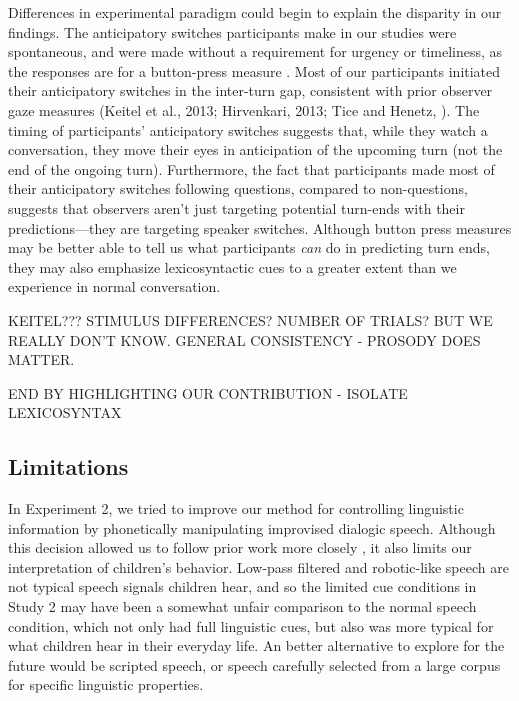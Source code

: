 \documentclass[authoryear, 12pt]{elsarticle}
\begin{document}
Differences in experimental paradigm could begin to explain the disparity in our findings. The anticipatory switches participants make in our studies were spontaneous, and were made without a requirement for urgency or timeliness, as the responses are for a button-press measure \citep{de-ruiter2006, magyari2012}. Most of our participants initiated their anticipatory switches in the inter-turn gap, consistent with prior observer gaze measures (Keitel et al., 2013; Hirvenkari, 2013; Tice and Henetz, \citeyear{TiceHenetz11}). The timing of participants' anticipatory switches suggests that, while they watch a conversation, they move their eyes in anticipation of the upcoming turn (not the end of the ongoing turn). Furthermore, the fact that participants made most of their anticipatory switches following questions, compared to non-questions, suggests that observers aren't just targeting potential turn-ends with their predictions---they are targeting speaker switches. Although button press measures may be better able to tell us what participants \textit{can} do in predicting turn ends, they may also emphasize lexicosyntactic cues to a greater extent than we experience in normal conversation. 

KEITEL??? STIMULUS DIFFERENCES? NUMBER OF TRIALS?  BUT WE REALLY DON'T KNOW. GENERAL CONSISTENCY - PROSODY DOES MATTER. 

END BY HIGHLIGHTING OUR CONTRIBUTION - ISOLATE LEXICOSYNTAX


\subsection{Limitations}

In Experiment 2, we tried to improve our method for controlling linguistic information by phonetically manipulating improvised dialogic speech. Although this decision allowed us to follow prior work more closely \cite{de-ruiter2006, keitel2013}, it also limits our interpretation of children's behavior. Low-pass filtered and robotic-like speech are not typical speech signals children hear, and so the limited cue conditions in Study 2 may have been a somewhat unfair comparison to the normal speech condition, which not only had full linguistic cues, but also was more typical for what children hear in their everyday life. An better alternative to explore for the future would be scripted speech, or speech carefully selected from a large corpus for specific linguistic properties. 
\end{document}
